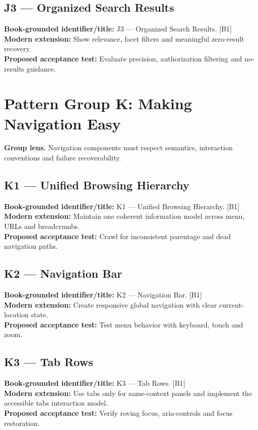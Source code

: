 \documentclass[11pt]{article}
\begin{document}
\subsection{J3 — Organized Search Results}
\noindent\textcolor{Ocean}{\textbf{Book-grounded identifier/title:}} J3 — Organized Search Results. [B1]\\
\textcolor{Mint}{\textbf{Modern extension:}} Show relevance, facet filters and meaningful zero-result recovery.\\
\textcolor{Amber}{\textbf{Proposed acceptance test:}} Evaluate precision, authorization filtering and no-results guidance.\medskip
\section{Pattern Group K: Making Navigation Easy}

\begin{notebox}\textbf{Group lens.} Navigation components must respect semantics, interaction conventions and failure recoverability.\end{notebox}
\subsection{K1 — Unified Browsing Hierarchy}
\noindent\textcolor{Ocean}{\textbf{Book-grounded identifier/title:}} K1 — Unified Browsing Hierarchy. [B1]\\
\textcolor{Mint}{\textbf{Modern extension:}} Maintain one coherent information model across menu, URLs and breadcrumbs.\\
\textcolor{Amber}{\textbf{Proposed acceptance test:}} Crawl for inconsistent parentage and dead navigation paths.\medskip
\subsection{K2 — Navigation Bar}
\noindent\textcolor{Ocean}{\textbf{Book-grounded identifier/title:}} K2 — Navigation Bar. [B1]\\
\textcolor{Mint}{\textbf{Modern extension:}} Create responsive global navigation with clear current-location state.\\
\textcolor{Amber}{\textbf{Proposed acceptance test:}} Test menu behavior with keyboard, touch and zoom.\medskip
\subsection{K3 — Tab Rows}
\noindent\textcolor{Ocean}{\textbf{Book-grounded identifier/title:}} K3 — Tab Rows. [B1]\\
\textcolor{Mint}{\textbf{Modern extension:}} Use tabs only for same-context panels and implement the accessible tabs interaction model.\\
\textcolor{Amber}{\textbf{Proposed acceptance test:}} Verify roving focus, aria-controls and focus restoration.\medskip
\end{document}
